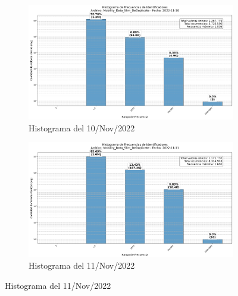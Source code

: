 \begin{figure}[H]
    \ContinuedFloat
    \centering
    \begin{subfigure}[t]{0.48\textwidth-1em}
        \includegraphics[width=\linewidth]{img/daily_histograms/histograma_identifier_Mobility_Data_Slim_DeDuplicate_2022-11-10.png}
        \caption{Histograma del 10/Nov/2022}
        \label{fig:sub5}
    \end{subfigure}
    \hfill
    \begin{subfigure}[t]{0.48\textwidth-1em}
        \includegraphics[width=\linewidth]{img/daily_histograms/histograma_identifier_Mobility_Data_Slim_DeDuplicate_2022-11-11.png}
        \caption{Histograma del 11/Nov/2022}
        \label{fig:sub6}
    \end{subfigure}

    \vspace{0.5cm}


\end{figure}

